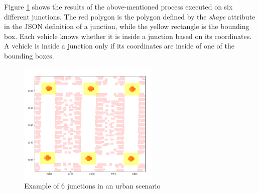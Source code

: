 		Figure \ref{fig:junction-example} shows the results of the above-mentioned process executed on six different junctions. The red polygon is the polygon defined by the \textit{shape} attribute in the JSON definition of a junction, while the yellow rectangle is the bounding box. Each vehicle knows whether it is inside a junction based on its coordinates. A vehicle is inside a junction only if its coordinates are inside of one of the bounding boxes.
	
		\begin{figure}[H]
			\centering
			\includegraphics[width=0.6\textwidth]{immagini/junction-example}
			\caption{Example of 6 junctions in an urban scenario}
			\label{fig:junction-example}
		\end{figure}
		